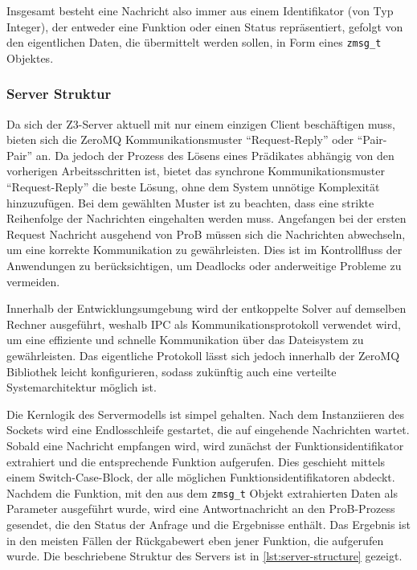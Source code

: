 Insgesamt besteht eine Nachricht also immer aus einem Identifikator (von Typ Integer), der entweder eine Funktion oder einen Status repräsentiert,
gefolgt von den eigentlichen Daten, die übermittelt werden sollen, in Form eines \texttt{zmsg\_t} Objektes.

\subsubsection{Server Struktur}

Da sich der Z3-Server aktuell mit nur einem einzigen Client beschäftigen muss,
bieten sich die ZeroMQ Kommunikationsmuster \enquote{Request-Reply} oder \enquote{Pair-Pair} an.
Da jedoch der Prozess des Lösens eines Prädikates abhängig von den vorherigen Arbeitsschritten ist,
bietet das synchrone Kommunikationsmuster \enquote{Request-Reply} die beste Lösung, ohne dem System unnötige Komplexität hinzuzufügen.
Bei dem gewählten Muster ist zu beachten, dass eine strikte Reihenfolge der Nachrichten eingehalten werden muss.
Angefangen bei der ersten Request Nachricht ausgehend von ProB müssen sich die Nachrichten abwechseln, um eine korrekte Kommunikation zu gewährleisten.
Dies ist im Kontrollfluss der Anwendungen zu berücksichtigen, um Deadlocks oder anderweitige Probleme zu vermeiden.

Innerhalb der Entwicklungsumgebung wird der entkoppelte Solver auf demselben Rechner ausgeführt,
weshalb IPC als Kommunikationsprotokoll verwendet wird, um eine effiziente und schnelle Kommunikation über das Dateisystem zu gewährleisten.
Das eigentliche Protokoll lässt sich jedoch innerhalb der ZeroMQ Bibliothek leicht konfigurieren, sodass zukünftig auch eine verteilte Systemarchitektur möglich ist.

Die Kernlogik des Servermodells ist simpel gehalten.
Nach dem Instanziieren des Sockets wird eine Endlosschleife gestartet, die auf eingehende Nachrichten wartet.
Sobald eine Nachricht empfangen wird, wird zunächst der Funktionsidentifikator extrahiert und die entsprechende Funktion aufgerufen.
Dies geschieht mittels einem Switch-Case-Block, der alle möglichen Funktionsidentifikatoren abdeckt.
Nachdem die Funktion, mit den aus dem \texttt{zmsg\_t} Objekt extrahierten Daten als Parameter ausgeführt wurde,
wird eine Antwortnachricht an den ProB-Prozess gesendet, die den Status der Anfrage und die Ergebnisse enthält.
Das Ergebnis ist in den meisten Fällen der Rückgabewert eben jener Funktion, die aufgerufen wurde.
Die beschriebene Struktur des Servers ist in \cref{lst:server-structure} gezeigt.

